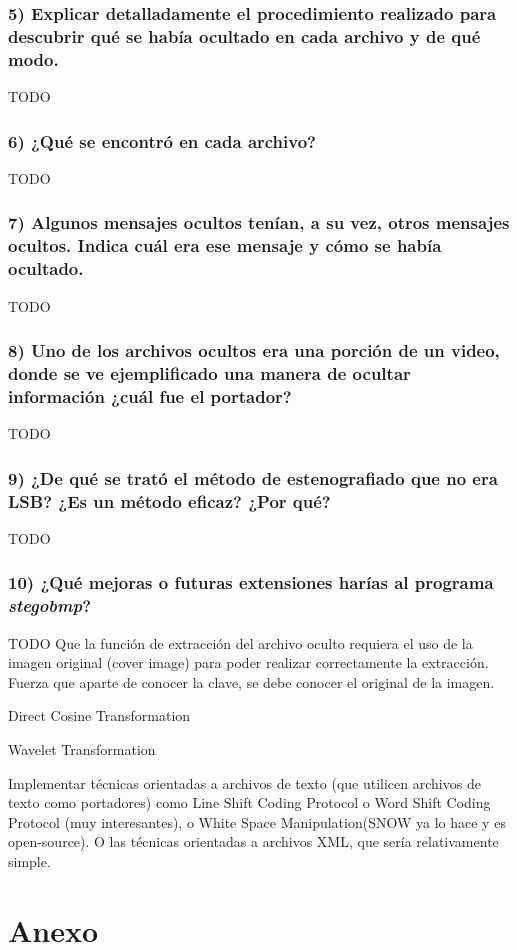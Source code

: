 \documentclass[a4paper,10pt]{article}
\begin{document}
\subsubsection*{ 5) Explicar detalladamente el procedimiento realizado para descubrir qué se había ocultado en
cada archivo y de qué modo.}

TODO

\subsubsection*{ 6) ¿Qué se encontró en cada archivo?}

TODO

\subsubsection*{ 7) Algunos mensajes ocultos tenían, a su vez, otros mensajes ocultos. Indica cuál era ese mensaje
y cómo se había ocultado.}

TODO

\subsubsection*{ 8) Uno de los archivos ocultos era una porción de un video, donde se ve ejemplificado una manera
de ocultar información ¿cuál fue el portador?}

TODO

\subsubsection*{ 9) ¿De qué se trató el método de estenografiado que no era LSB? ¿Es un método eficaz? ¿Por qué?}

TODO

\subsubsection*{ 10) ¿Qué mejoras o futuras extensiones harías al programa \textit{stegobmp}?}

TODO
Que la función de extracción del archivo oculto requiera el uso de la imagen original (cover image) para poder realizar correctamente la extracción.
Fuerza que aparte de conocer la clave, se debe conocer el original de la imagen.

 Direct Cosine Transformation

 Wavelet Transformation


Implementar técnicas orientadas a archivos de texto (que utilicen archivos de texto como portadores) como Line Shift Coding Protocol o Word Shift Coding Protocol (muy interesantes),
 o White Space Manipulation(SNOW ya lo hace y es open-source). O las técnicas orientadas a archivos XML, que sería relativamente simple.

\clearpage
\appendix
\section{Anexo}
\end{document}
